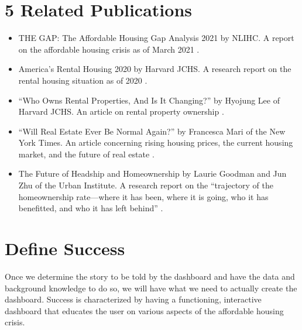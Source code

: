 \documentclass{proc}
\begin{document}
\section{5 Related Publications}
\begin{itemize}
    \item THE GAP: The Affordable Housing Gap Analysis 2021 by NLIHC. A report on the affordable housing crisis as of March 2021 \cite{gap}.
    \item America’s Rental Housing 2020 by Harvard JCHS. A research report on the rental housing situation as of 2020 \cite{JCHSreport}.
    \item “Who Owns Rental Properties, And Is It Changing?” by Hyojung Lee of Harvard JCHS. An article on rental property ownership \cite{lee}.
    \item “Will Real Estate Ever Be Normal Again?” by Francesca Mari of the New York Times. An article concerning rising housing prices, the current housing market, and the future of real estate \cite{mari}.
    \item The Future of Headship and Homeownership by Laurie Goodman and Jun Zhu of the Urban Institute. A research report on the “trajectory of the homeownership rate—where it has been, where it is going, who it has benefitted, and who it has left behind” \cite{urban}.
\end{itemize}

\section{Define Success}
Once we determine the story to be told by the dashboard and have the data and background knowledge to do so, we will have what we need to actually create the dashboard. Success is characterized by having a functioning, interactive dashboard that educates the user on various aspects of the affordable housing crisis.



\end{document}
